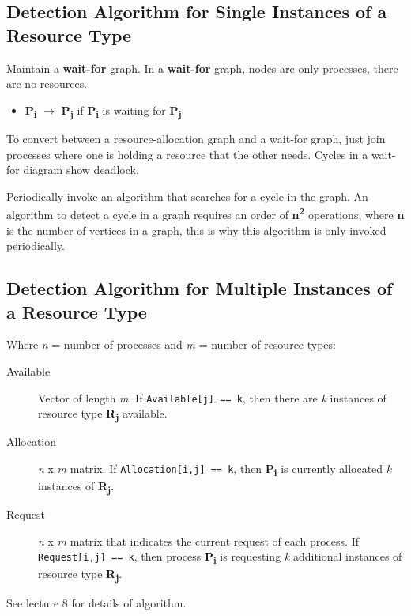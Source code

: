 \documentclass[11pt]{article}
\begin{document}
\subsection{Detection Algorithm for Single Instances of a Resource Type}
\label{sec:org7c77c54}
Maintain a \textbf{wait-for} graph.
In a \textbf{wait-for} graph, nodes are only processes, there are no resources.

\begin{itemize}
\item \textbf{P\textsubscript{i}} \(\rightarrow\) \textbf{P\textsubscript{j}} if \textbf{P\textsubscript{i}} is waiting for \textbf{P\textsubscript{j}}
\end{itemize}

To convert between a resource-allocation graph and a wait-for graph, just join processes where one is holding a resource that the other needs.
Cycles in a wait-for diagram show deadlock.

Periodically invoke an algorithm that searches for a cycle in the graph.
An algorithm to detect a cycle in a graph requires an order of \textbf{n\textsuperscript{2}} operations, where \textbf{n} is the number of vertices in a graph, this is why this algorithm is only invoked periodically.

\subsection{Detection Algorithm for Multiple Instances of a Resource Type}
\label{sec:orgf38b62c}
Where \emph{n} = number of processes and \emph{m} = number of resource types:

\begin{description}
\item[{Available}] Vector of length \emph{m}. If \texttt{Available[j] == k}, then there are \emph{k} instances of resource type \textbf{R\textsubscript{j}} available.
\item[{Allocation}] \emph{n} x \emph{m} matrix. If \texttt{Allocation[i,j] == k}, then \textbf{P\textsubscript{i}} is currently allocated \emph{k} instances of \textbf{R\textsubscript{j}}.
\item[{Request}] \emph{n} x \emph{m} matrix that indicates the current request of each process. If \texttt{Request[i,j] == k}, then process \textbf{P\textsubscript{i}} is requesting \emph{k} additional instances of resource type \textbf{R\textsubscript{j}}.
\end{description}

See lecture 8 for details of algorithm. 
\end{document}
